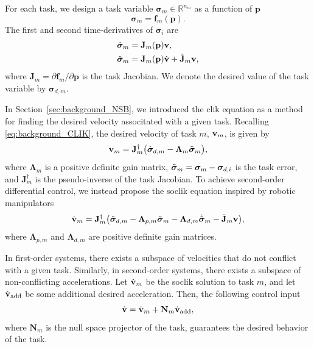 For each task, we design a task variable $\bm{\sigma}_m \in \mathbb{R}^{n_m}$ as a function of $\mathbf{p}$
\begin{equation}
    \bm{\sigma}_m = \mathbf{f}_m(\mathbf{p}).
\end{equation}
The first and second time-derivatives of $\bm{\sigma}_i$ are
\begin{subequations}\label{eq:task_derivatives}
    \begin{align}
        \dot{\bm{\sigma}}_m &= \mathbf{J}_m(\mathbf{p})\mathbf{v},\\
        \ddot{\bm{\sigma}}_m &= \mathbf{J}_m(\mathbf{p})\dot{\mathbf{v}} + \dot{\mathbf{J}}_m \mathbf{v},\label{eq:task_second_derivative}
    \end{align}
\end{subequations}
where $\mathbf{J}_m = \partial \mathbf{f}_m/\partial \mathbf{p}$ is the task Jacobian. We denote the desired value of the task variable by $\bm{\sigma}_{d, m}$.

In Section~\ref{sec:background_NSB}, we introduced the \acrfull{clik} equation as a method for finding the desired velocity associtated with a given task.
Recalling \eqref{eq:background_CLIK}, the desired velocity of task $m$, $\mathbf{v}_m$, is given by
\begin{equation}
    \mathbf{v}_m = \mathbf{J}_m^\dagger\bigl(\dot{\bm{\sigma}}_{d, m} - \bm{\Lambda}_m \Tilde{\bm{\sigma}}_m\bigr),
\end{equation}
where $\bm{\Lambda}_m$ is a positive definite gain matrix, $\Tilde{\bm{\sigma}}_m = \bm{\sigma}_m - \bm{\sigma}_{d,i}$ is the task error, and $\mathbf{J}_m^\dagger$ is the pseudo-inverse of the task Jacobian. 
To achieve second-order differential control, we instead propose the \gls{soclik} equation inspired by robotic manipulators \cite{siciliano_closed-loop_1990}
\begin{equation}
    \dot{\mathbf{v}}_m = \mathbf{J}_m^\dagger \bigl(\ddot{\bm{\sigma}}_{d,m} - \mathbf{\Lambda}_{p,m}\Tilde{\bm{\sigma}}_m - \mathbf{\Lambda}_{d,m} \dot{\Tilde{\bm{\sigma}}}_m - \dot{\mathbf{J}}_m \mathbf{v}\bigr), \label{eq:general_acceleration}
\end{equation}
where $\mathbf{\Lambda}_{p,m}$ and $\mathbf{\Lambda}_{d,m}$ are positive definite gain matrices.

In first-order systems, there exists a subspace of velocities that do not conflict with a given task.
Similarly, in second-order systems, there exists a subspace of non-conflicting accelerations.
Let $\dot{\mathbf{v}}_m$ be the \gls{soclik} solution to task $m$, and let $\dot{\mathbf{v}}_{\rm add}$ be some additional desired acceleration.
Then, the following control input
\begin{equation}
    \dot{\mathbf{v}} = \dot{\mathbf{v}}_m +\mathbf{N}_m \dot{\mathbf{v}}_{\rm add},
    \label{eq:NSB_two_tasks}
\end{equation}
where $\mathbf{N}_m$ is the null space projector of the task, guarantees the desired behavior of the task.

